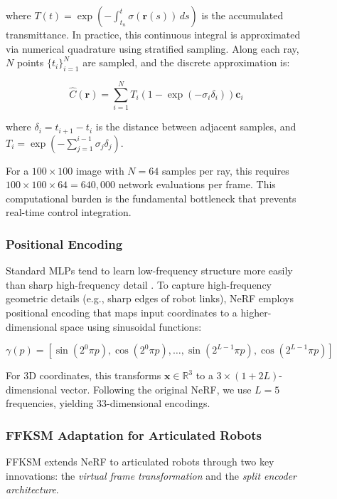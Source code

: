 \documentclass[12pt,a4paper,oneside]{report}
\begin{document}
\begin{figure}[H]
where $T(t) = \exp\left(-\int_{t_n}^{t} \sigma(\mathbf{r}(s)) \, ds\right)$ is the accumulated transmittance. In practice, this continuous integral is approximated via numerical quadrature using stratified sampling. Along each ray, $N$ points $\{t_i\}_{i=1}^N$ are sampled, and the discrete approximation is:

\begin{equation}
\hat{C}(\mathbf{r}) = \sum_{i=1}^{N} T_i (1 - \exp(-\sigma_i \delta_i)) \mathbf{c}_i
\end{equation}

where $\delta_i = t_{i+1} - t_i$ is the distance between adjacent samples, and $T_i = \exp\left(-\sum_{j=1}^{i-1} \sigma_j \delta_j\right)$.

For a $100 \times 100$ image with $N = 64$ samples per ray, this requires $100 \times 100 \times 64 = 640,000$ network evaluations per frame. This computational burden is the fundamental bottleneck that prevents real-time control integration.

\subsubsection{Positional Encoding}

Standard MLPs tend to learn low-frequency structure more easily than sharp high-frequency detail \cite{rahaman2019spectral}. To capture high-frequency geometric details (e.g., sharp edges of robot links), NeRF employs positional encoding that maps input coordinates to a higher-dimensional space using sinusoidal functions:

\begin{equation}
\gamma(p) = [\sin(2^0 \pi p), \cos(2^0 \pi p), \ldots, \sin(2^{L-1} \pi p), \cos(2^{L-1} \pi p)]
\end{equation}

For 3D coordinates, this transforms $\mathbf{x} \in \mathbb{R}^3$ to a $3 \times (1 + 2L)$-dimensional vector. Following the original NeRF, we use $L = 5$ frequencies, yielding 33-dimensional encodings.

\subsubsection{FFKSM Adaptation for Articulated Robots}

FFKSM extends NeRF to articulated robots through two key innovations: the \textit{virtual frame transformation} and the \textit{split encoder architecture}.


\end{figure}
\end{document}
